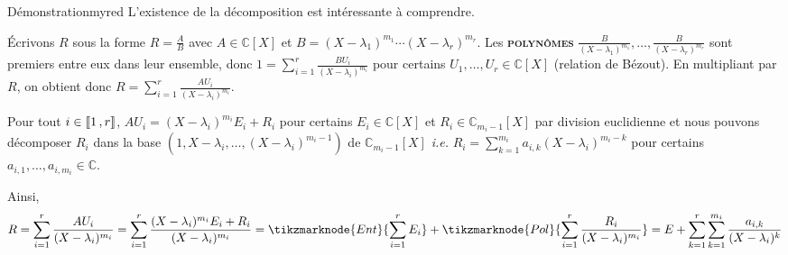     \begin{demo}{Démonstration}{myred}
        L’existence de la décomposition est intéressante à comprendre. 

        Écrivons $R$ sous la forme $R = \frac{A}{B}$ avec $A \in \mathbb{C}[X]$ et $B = (X - \lambda_1)^{m_1} \cdots (X - \lambda_r)^{m_r}$. Les \textbf{\textsc{polynômes}} $\frac{B}{(X-\lambda_1)^{m_1}}, \ldots, \frac{B}{(X-\lambda_r)^{m_r}}$ sont premiers entre eux dans leur ensemble, donc $1 = \sum_{i=1}^{r} \frac{BU_i}{(X - \lambda_i)^{m_i}}$ pour certains $U_1,\ldots,U_r \in \mathbb{C}[X]$ (relation de Bézout). En multipliant par $R$, on obtient donc $R = \sum_{i=1}^{r} \frac{A U_i}{(X - \lambda_i)^{m_i}}$.

        Pour tout $i \in \left\llbracket 1 \, , r \right\rrbracket$, $A U_i = (X - \lambda_i)^{m_i} E_i + R_i$ pour certains $E_i \in \mathbb{C}[X]$ et $R_i \in \mathbb{C}_{m_i - 1}[X]$ par division euclidienne et nous pouvons décomposer $R_i$ dans la base $(1, X - \lambda_i, \ldots, (X - \lambda_i)^{m_i - 1})$ de $\mathbb{C}_{m_i - 1}[X]$ \textit{i.e.} $R_i = \sum_{k=1}^{m_i} a_{i,k} (X-\lambda_i)^{m_i - k}$ pour certains $a_{i,1},\ldots,a_{i,m_i} \in \mathbb{C}$. 

        Ainsi, 
        \[ R = \sum_{i=1}^{r} \frac{AU_i}{(X-\lambda_i)^{m_i}} = \sum_{i=1}^{r} \frac{(X-\lambda_i)^{m_i} E_i + R_i}{(X - \lambda_i)^{m_i}} = \tikzmarknode{Ent}{\sum_{i=1}^{r} E_i} + \tikzmarknode{Pol}{\sum_{i=1}^{r} \frac{R_i}{(X-\lambda_i)^{m_i}}} = E + \sum_{k=1}^{r} \sum_{k=1}^{m_i} \frac{a_{i,k}}{(X-\lambda_i)^k} \]
        \begin{center}\footnotesize 
            \hspace*{2cm}
            \hspace*{3cm}
        \end{center}
    \end{demo}

